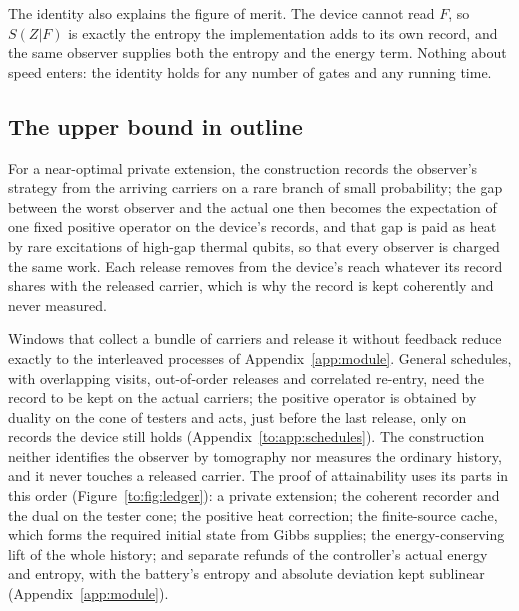 The identity also explains the figure of merit. The device cannot read $F$, so $S(Z|F)$ is exactly the entropy the implementation adds to its own record, and the same observer supplies both the entropy and the energy term. Nothing about speed enters: the identity holds for any number of gates and any running time.

\subsection{The upper bound in outline}\label{sec:upperbound}

For a near-optimal private extension, the construction records the observer's strategy from the arriving carriers on a rare branch of small probability; the gap between the worst observer and the actual one then becomes the expectation of one fixed positive operator on the device's records, and that gap is paid as heat by rare excitations of high-gap thermal qubits, so that every observer is charged the same work. Each release removes from the device's reach whatever its record shares with the released carrier, which is why the record is kept coherently and never measured.

Windows that collect a bundle of carriers and release it without feedback reduce exactly to the interleaved processes of Appendix~\ref{app:module}. General schedules, with overlapping visits, out-of-order releases and correlated re-entry, need the record to be kept on the actual carriers; the positive operator is obtained by duality on the cone of testers and acts, just before the last release, only on records the device still holds (Appendix~\ref{to:app:schedules}). The construction neither identifies the observer by tomography nor measures the ordinary history, and it never touches a released carrier. The proof of attainability uses its parts in this order (Figure~\ref{to:fig:ledger}): a private extension; the coherent recorder and the dual on the tester cone; the positive heat correction; the finite-source cache, which forms the required initial state from Gibbs supplies; the energy-conserving lift of the whole history; and separate refunds of the controller's actual energy and entropy, with the battery's entropy and absolute deviation kept sublinear (Appendix~\ref{app:module}).

